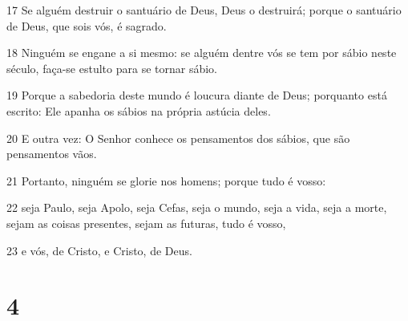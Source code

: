 \par 17 Se alguém destruir o santuário de Deus, Deus o destruirá; porque o santuário de Deus, que sois vós, é sagrado.
\par 18 Ninguém se engane a si mesmo: se alguém dentre vós se tem por sábio neste século, faça-se estulto para se tornar sábio.
\par 19 Porque a sabedoria deste mundo é loucura diante de Deus; porquanto está escrito: Ele apanha os sábios na própria astúcia deles.
\par 20 E outra vez: O Senhor conhece os pensamentos dos sábios, que são pensamentos vãos.
\par 21 Portanto, ninguém se glorie nos homens; porque tudo é vosso:
\par 22 seja Paulo, seja Apolo, seja Cefas, seja o mundo, seja a vida, seja a morte, sejam as coisas presentes, sejam as futuras, tudo é vosso,
\par 23 e vós, de Cristo, e Cristo, de Deus.

\chapter{4}

